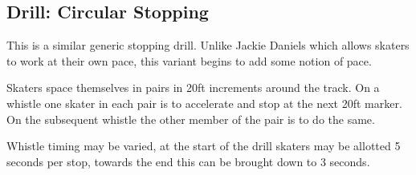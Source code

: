 \subsection*{Drill: Circular Stopping}
\label{drill:stopping/circular}

This is a similar generic stopping drill.  
Unlike Jackie Daniels which allows skaters to work at their own pace, this variant begins to add some notion of pace.


Skaters space themselves in pairs in 20ft increments around the track. 
On a whistle one skater in each pair is to accelerate and stop at the next 20ft marker. 
On the subsequent whistle the other member of the pair is to do the same. 

Whistle timing may be varied, at the start of the drill skaters may be allotted 5 seconds per stop, towards the end this can be brought down to 3 seconds. 


